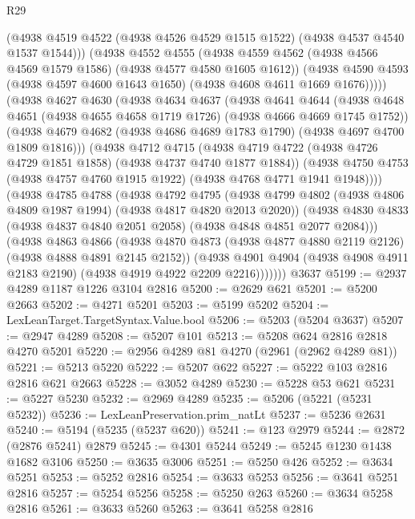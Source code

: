 \begin{lexlean}{R29}
\begin{coremodule}
              (@4938 @4519 @4522 (@4938 @4526 @4529 @1515 @1522) (@4938 @4537 @4540 @1537 @1544)))
            (@4938
              @4552
              @4555
              (@4938 @4559 @4562 (@4938 @4566 @4569 @1579 @1586) (@4938 @4577 @4580 @1605 @1612))
              (@4938 @4590 @4593 (@4938 @4597 @4600 @1643 @1650) (@4938 @4608 @4611 @1669 @1676)))))
        (@4938
          @4627
          @4630
          (@4938
            @4634
            @4637
            (@4938
              @4641
              @4644
              (@4938 @4648 @4651 (@4938 @4655 @4658 @1719 @1726) (@4938 @4666 @4669 @1745 @1752))
              (@4938 @4679 @4682 (@4938 @4686 @4689 @1783 @1790) (@4938 @4697 @4700 @1809 @1816)))
            (@4938
              @4712
              @4715
              (@4938 @4719 @4722 (@4938 @4726 @4729 @1851 @1858) (@4938 @4737 @4740 @1877 @1884))
              (@4938 @4750 @4753 (@4938 @4757 @4760 @1915 @1922) (@4938 @4768 @4771 @1941 @1948))))
          (@4938
            @4785
            @4788
            (@4938
              @4792
              @4795
              (@4938 @4799 @4802 (@4938 @4806 @4809 @1987 @1994) (@4938 @4817 @4820 @2013 @2020))
              (@4938 @4830 @4833 (@4938 @4837 @4840 @2051 @2058) (@4938 @4848 @4851 @2077 @2084)))
            (@4938
              @4863
              @4866
              (@4938 @4870 @4873 (@4938 @4877 @4880 @2119 @2126) (@4938 @4888 @4891 @2145 @2152))
              (@4938
                @4901
                @4904
                (@4938 @4908 @4911 @2183 @2190)
                (@4938 @4919 @4922 @2209 @2216)))))))
    @3637
@5199 := @2937 @4289 @1187 @1226 @3104 @2816
@5200 := @2629 @621
@5201 := @5200 @2663
@5202 := @4271 @5201
@5203 := @5199 @5202
@5204 := LexLeanTarget.TargetSyntax.Value.bool
@5206 := @5203 (@5204 @3637)
@5207 := @2947 @4289
@5208 := @5207 @101
@5213 := @5208 @624 @2816 @2818 @4270 @5201
@5220 := @2956 @4289 @81 @4270 (@2961 (@2962 @4289 @81))
@5221 := @5213 @5220
@5222 := @5207 @622
@5227 := @5222 @103 @2816 @2816 @621 @2663
@5228 := @3052 @4289
@5230 := @5228 @53 @621
@5231 := @5227 @5230
@5232 := @2969 @4289
@5235 := @5206 (@5221 (@5231 @5232))
@5236 := LexLeanPreservation.prim_natLt
@5237 := @5236 @2631
@5240 := @5194 (@5235 (@5237 @620))
@5241 := @123 @2979
@5244 := @2872 (@2876 @5241) @2879
@5245 := @4301 @5244
@5249 := @5245 @1230 @1438 @1682 @3106
@5250 := @3635 @3006
@5251 := @5250 @426
@5252 := @3634 @5251
@5253 := @5252 @2816
@5254 := @3633 @5253
@5256 := @3641 @5251 @2816
@5257 := @5254 @5256
@5258 := @5250 @263
@5260 := @3634 @5258 @2816
@5261 := @3633 @5260
@5263 := @3641 @5258 @2816

\end{coremodule}
\end{lexlean}
